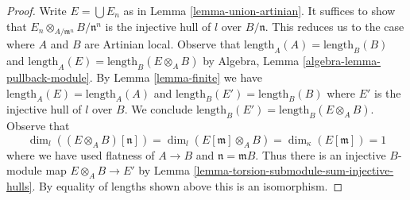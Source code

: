 \documentclass[10pt,a4paper]{amsart}
\theoremstyle{plain}
\theoremstyle{definition}
\theoremstyle{remark}
\numberwithin{equation}{subsection}
\begin{document}
\begin{proof}
Write $E = \bigcup E_n$ as in Lemma \ref{lemma-union-artinian}.
It suffices to show that $E_n \otimes_{A/\mathfrak m^n} B/\mathfrak n^n$
is the injective hull of $l$ over $B/\mathfrak n$.
This reduces us to the case where $A$ and $B$ are Artinian local.
Observe that $\text{length}_A(A) = \text{length}_B(B)$ and
$\text{length}_A(E) = \text{length}_B(E \otimes_A B)$
by Algebra, Lemma \ref{algebra-lemma-pullback-module}.
By Lemma \ref{lemma-finite} we have
$\text{length}_A(E) = \text{length}_A(A)$ and
$\text{length}_B(E') = \text{length}_B(B)$
where $E'$ is the injective hull of $l$ over $B$.
We conclude $\text{length}_B(E') = \text{length}_B(E \otimes_A B)$.
Observe that
$$
\dim_l((E \otimes_A B)[\mathfrak n]) =
\dim_l(E[\mathfrak m] \otimes_A B) =
\dim_\kappa(E[\mathfrak m]) = 1
$$
where we have used flatness of $A \to B$ and $\mathfrak n = \mathfrak mB$.
Thus there is an injective $B$-module map $E \otimes_A B \to E'$
by Lemma \ref{lemma-torsion-submodule-sum-injective-hulls}.
By equality of lengths shown above this is an isomorphism.
\end{proof}
\end{document}

